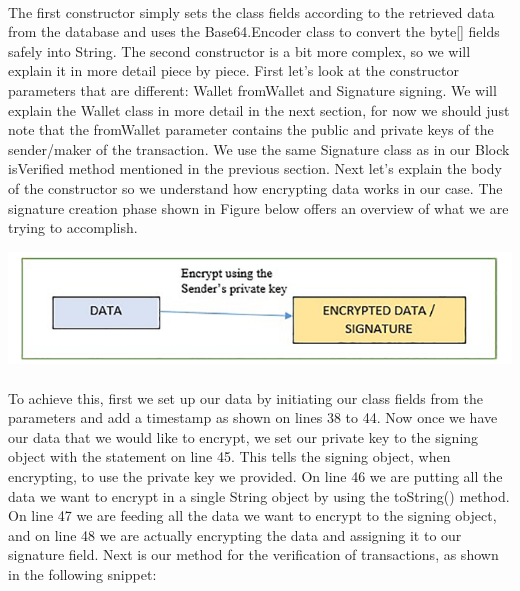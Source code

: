 \documentclass[12pt,a4paper]{report}
\begin{document}
\paragraph{}
The first constructor simply sets the class fields according to the retrieved data from the database and uses the Base64.Encoder class to convert the byte[] fields safely into String.
The second constructor is a bit more complex, so we will explain it in more detail piece by piece. First let’s look at the constructor parameters that are different: Wallet fromWallet and Signature signing. We will explain the Wallet class in more detail in the next section, for now we should just note that the fromWallet parameter contains the public and private keys of the sender/maker of the transaction. We use the same Signature class as in our Block isVerified method mentioned in the previous section.
Next let’s explain the body of the constructor so we understand how encrypting data works in our case. The signature creation phase shown in Figure below offers an overview of what we are trying to accomplish.


\includegraphics[width=\textwidth]{image.png}
\paragraph{}


To achieve this, first we set up our data by initiating our class fields from the parameters and add a timestamp as shown on lines 38 to 44. Now once we have our data that we would like to encrypt, we set our private key to the signing object with the statement on line 45. This tells the signing object, when encrypting, to use the private key we provided. On line 46 we are putting all the data we want to encrypt in a single String object by using the toString() method. On line 47 we are feeding all the data we want to encrypt to the signing object, and on line 48 we are actually encrypting the data and assigning it to our signature field.
Next is our method for the verification of transactions, as shown in the following snippet:
\paragraph{}
\end{document}

